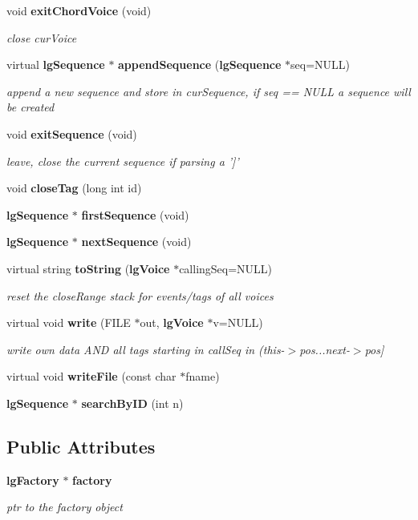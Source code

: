 \begin{CompactItemize}
void {\bf exit\-Chord\-Voice} (void)
\begin{CompactList}\small\item\em close cur\-Voice \item\end{CompactList}\item 
virtual {\bf lg\-Sequence} $\ast$ {\bf append\-Sequence} ({\bf lg\-Sequence} $\ast$seq=NULL)
\begin{CompactList}\small\item\em append a new sequence and store in cur\-Sequence, if seq == NULL a sequence will be created \item\end{CompactList}\item 
void {\bf exit\-Sequence} (void)
\begin{CompactList}\small\item\em leave, close the current sequence if parsing a ']' \item\end{CompactList}\item 
void {\bf close\-Tag} (long int id)
\item 
{\bf lg\-Sequence} $\ast$ {\bf first\-Sequence} (void)
\item 
{\bf lg\-Sequence} $\ast$ {\bf next\-Sequence} (void)
\item 
virtual string {\bf to\-String} ({\bf lg\-Voice} $\ast$calling\-Seq=NULL)
\begin{CompactList}\small\item\em reset the close\-Range stack for events/tags of all voices \item\end{CompactList}\item 
virtual void {\bf write} (FILE $\ast$out, {\bf lg\-Voice} $\ast$v=NULL)
\begin{CompactList}\small\item\em write own data AND all tags starting in call\-Seq in (this-$>$pos...next-$>$pos] \item\end{CompactList}\item 
virtual void {\bf write\-File} (const char $\ast$fname)
\item 
{\bf lg\-Sequence} $\ast$ {\bf search\-By\-ID} (int n)
\end{CompactItemize}
\subsection*{Public Attributes}
\begin{CompactItemize}
\item 
{\bf lg\-Factory} $\ast$ {\bf factory}
\begin{CompactList}\small\item\em ptr to the factory object \item\end{CompactList}\end{CompactItemize}
